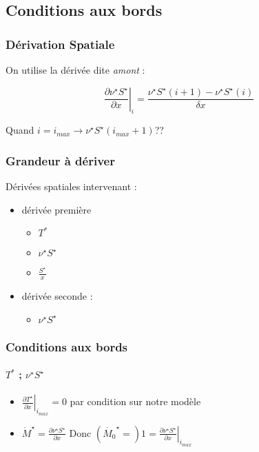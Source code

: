 \subsection{Conditions aux bords}


\begin{frame}
\frametitle{Dérivation Spatiale}

On utilise la dérivée dite \textit{amont} : 

\begin{equation*}
\left. \frac{\partial \nu^{\star} S^{\star}}{\partial x} \right|_i = \frac{\nu^{\star}S^{\star}(i+1)-\nu^{\star}S^{\star}(i)}{\delta x} 
\end{equation*}


Quand $i=i_{max} \rightarrow \nu^{\star}S^{\star}(i_{max}+1) $??

\end{frame}


\begin{frame}
\frametitle{Grandeur à dériver}
Dérivées spatiales intervenant :

\begin{itemize}
    \item dérivée première
    \begin{itemize}
        \item $T^*$
        \item $ \nu^{\star}S^{\star}$
        \item $\frac{S^{\star}}{x}$
    \end{itemize}
    \item dérivée seconde :
    \begin{itemize}
        \item $ \nu^{\star}S^{\star}$
    \end{itemize}
\end{itemize}

\end{frame}


\begin{frame}
\frametitle{Conditions aux bords}
\framesubtitle{$T^*$ ; $\nu^{\star} S^{\star}$}

\begin{itemize}

\item $\left.\frac{\partial T^{\star}}{\partial x}\right|_{i_{max}} =0$ par condition sur notre modèle

\item $\dot{M}^{\star} = \frac{\partial \nu^{\star} S^{\star}}{\partial x}$ Donc $ (\dot{M_0}^{\star} =)1= \left. \frac{\partial \nu^{\star} S^{\star}}{\partial x} \right|_{i_{max}} $

\end{itemize}

\end{frame}

